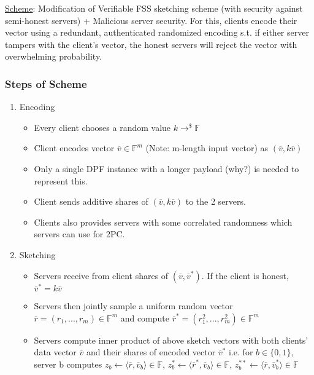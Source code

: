 \underline{Scheme}: Modification of Verifiable FSS sketching scheme (with security against semi-honest servers) + Malicious server security. For this, clients encode their vector using a redundant, authenticated randomized encoding s.t. if either server tampers with the client's vector, the honest servers will reject the vector with overwhelming probability.

\subsubsection{Steps of Scheme}
\begin{enumerate}
    \item Encoding
    \begin{itemize}
        \item Every client chooses a random value $k \rightarrow^\$ \mathbb{F}$
        \item Client encodes vector $\overline{v} \in \mathbb{F}^m$ (Note: m-length input vector) as $(\overline{v}, k\overline{v})$
        \item Only a single DPF instance with a longer payload (why?) is needed to represent this.
        \item Client sends additive shares of $(\overline{v}, k\overline{v})$ to the 2 servers.
        \item Clients also provides servers with some correlated randomness which servers can use for 2PC.
    \end{itemize}
    \item Sketching
    \begin{itemize}
        \item Servers receive from client shares of $(\overline{v}, \overline{v}^*)$. If the client is honest, $\overline{v}^* = k\overline{v}$
        \item Servers then jointly sample a uniform random vector $\overline{r} = (r_1, ..., r_m) \in \mathbb{F}^m$ and compute $\overline{r}^* = (r_1^2, ..., r_m^2) \in \mathbb{F}^m$
        \item Servers compute inner product of above sketch vectors with both clients' data vector $\overline{v}$ and their shares of encoded vector $\overline{v}^*$ i.e. for $b \in \{0, 1\}$, server b computes $z_b \leftarrow \langle \overline{r}, \overline{v}_b \rangle \in \mathbb{F}$, $z_b^* \leftarrow \langle \overline{r}^*, \overline{v}_b \rangle \in \mathbb{F}$, $z_b^{**} \leftarrow \langle \overline{r}, \overline{v}_b^* \rangle \in \mathbb{F}$
    \end{itemize}

\end{enumerate}

